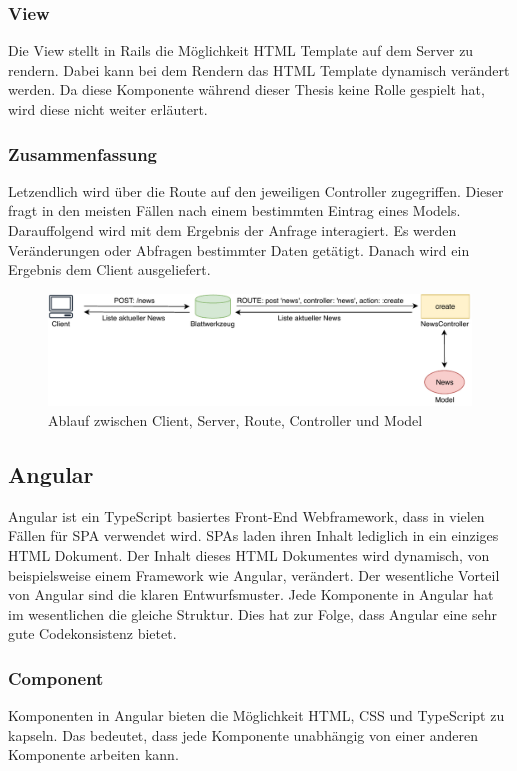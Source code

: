 \subsubsection{View}
\label{sec: rails_view}
Die View stellt in Rails die Möglichkeit \gls{HTML} Template auf dem Server zu rendern. Dabei kann bei dem Rendern das \gls{HTML} Template dynamisch verändert werden. Da diese Komponente während dieser Thesis keine Rolle gespielt hat, wird diese nicht weiter erläutert.

\subsubsection{Zusammenfassung}
\label{sec: rails_resuemee}
Letzendlich wird über die Route auf den jeweiligen Controller zugegriffen. Dieser fragt in den meisten Fällen nach einem bestimmten Eintrag eines Models. Darauffolgend wird mit dem Ergebnis der Anfrage interagiert. Es werden Veränderungen oder Abfragen bestimmter Daten getätigt. Danach wird ein Ergebnis dem Client ausgeliefert.

\begin{figure}[h]
	\includegraphics[width=\textwidth]{graphics/rails-mvc.pdf}
	\caption{Ablauf zwischen Client, Server, Route, Controller und Model}
	\label{fig:rails-mvc}
\end{figure}

\subsection{Angular}
\label{sec: angular}
Angular ist ein TypeScript basiertes Front-End Webframework, dass in vielen Fällen für \gls{SPA} verwendet wird. \gls{SPA}s laden ihren Inhalt lediglich in ein einziges \gls{HTML} Dokument. Der Inhalt dieses \gls{HTML} Dokumentes wird dynamisch, von beispielsweise einem Framework wie Angular, verändert. Der wesentliche Vorteil von Angular sind die klaren Entwurfsmuster. Jede Komponente in Angular hat im wesentlichen die gleiche Struktur. Dies hat zur Folge, dass Angular eine sehr gute Codekonsistenz bietet.


\subsubsection{Component}
\label{sec: ang-component}
Komponenten in Angular bieten die Möglichkeit \gls{HTML}, \gls{CSS} und TypeScript zu kapseln. Das bedeutet, dass jede Komponente unabhängig von einer anderen Komponente arbeiten kann.

